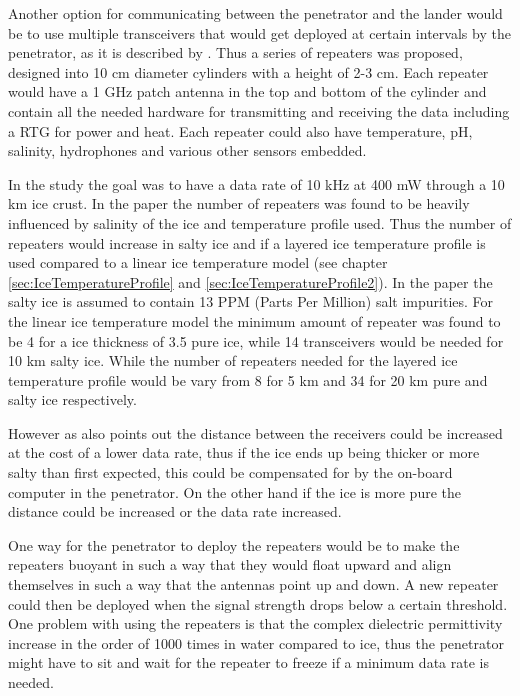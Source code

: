 
Another option for communicating between the penetrator and the lander would be to use multiple transceivers that would get deployed at certain intervals by the penetrator, as it is described by \citet{iceLink-scott}. Thus a series of repeaters was proposed, designed into 10 cm diameter cylinders with a height of 2-3 cm. Each repeater would have a 1 GHz patch antenna in the top and bottom of the cylinder and contain all the needed hardware for transmitting and receiving the data including a RTG for power and heat. Each repeater could also have temperature, pH, salinity, hydrophones and various other sensors embedded.

In the study the goal was to have a data rate of 10 kHz at 400 mW through a 10 km ice crust. In the paper the number of repeaters was found to be heavily influenced by salinity of the ice and temperature profile used. Thus the number of repeaters would increase in salty ice and if a layered ice temperature profile is used compared to a linear ice temperature model (see chapter \ref{sec:IceTemperatureProfile} and \ref{sec:IceTemperatureProfile2}). In the paper the salty ice is assumed to contain 13 PPM (Parts Per Million) salt impurities. For the linear ice temperature model the minimum amount of repeater was found to be 4 for a ice thickness of 3.5 pure ice, while 14 transceivers would be needed for 10 km salty ice. While the number of repeaters needed for the layered ice temperature profile would be vary from 8 for 5 km and 34 for 20 km pure and salty ice respectively.

However as \citet{iceLink-scott} also points out the distance between the receivers could be increased at the cost of a lower data rate, thus if the ice ends up being thicker or more salty than first expected, this could be compensated for by the on-board computer in the penetrator. On the other hand if the ice is more pure the distance could be increased or the data rate increased.

One way for the penetrator to deploy the repeaters would be to make the repeaters buoyant in such a way that they would float upward and align themselves in such a way that the antennas point up and down. A new repeater could then be deployed when the signal strength drops below a certain threshold. One problem with using the repeaters is that the complex dielectric permittivity increase in the order of 1000 times in water compared to ice, thus the penetrator might have to sit and wait for the repeater to freeze if a minimum data rate is needed.

